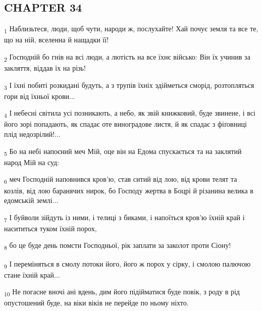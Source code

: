 \subsection{CHAPTER 34}
\begin{tcolorbox}
\textsubscript{1} Наблизьтеся, люди, щоб чути, народи ж, послухайте! Хай почує земля та все те, що на ній, вселенна й нащадки її!
\end{tcolorbox}
\begin{tcolorbox}
\textsubscript{2} Господній бо гнів на всі люди, а лютість на все їхнє військо: Він їх учинив за закляття, віддав їх на різь!
\end{tcolorbox}
\begin{tcolorbox}
\textsubscript{3} І їхні побиті розкидані будуть, а з трупів їхніх здійметься сморід, розтопляться гори від їхньої крови...
\end{tcolorbox}
\begin{tcolorbox}
\textsubscript{4} І небесні світила усі позникають, а небо, як звій книжковий, буде звинене, і всі його зорі попадають, як спадає оте виноградове листя, й як спадає з фіґовниці плід недозрілий!...
\end{tcolorbox}
\begin{tcolorbox}
\textsubscript{5} Бо на небі напоєний меч Мій, оце він на Едома спускається та на заклятий народ Мій на суд:
\end{tcolorbox}
\begin{tcolorbox}
\textsubscript{6} меч Господній наповнився кров'ю, став ситий від лою, від крови телят та козлів, від лою баранячих нирок, бо Господу жертва в Боцрі й різанина велика в едомській землі...
\end{tcolorbox}
\begin{tcolorbox}
\textsubscript{7} І буйволи зійдуть із ними, і телиці з биками, і напоїться кров'ю їхній край і насититься туком їхній порох,
\end{tcolorbox}
\begin{tcolorbox}
\textsubscript{8} бо це буде день помсти Господньої, рік заплати за заколот проти Сіону!
\end{tcolorbox}
\begin{tcolorbox}
\textsubscript{9} І переміняться в смолу потоки його, його ж порох у сірку, і смолою палючою стане їхній край...
\end{tcolorbox}
\begin{tcolorbox}
\textsubscript{10} Не погасне вночі ані вдень, дим його підійматися буде повік, з роду в рід опустошений буде, на віки віків не перейде по ньому ніхто.
\end{tcolorbox}
